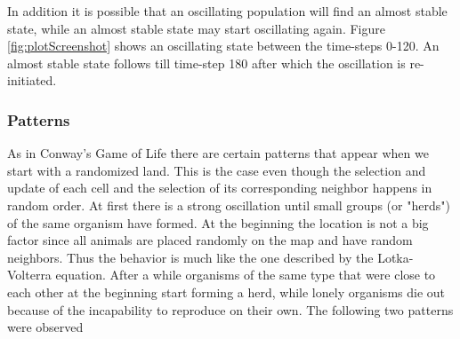 \documentclass[11pt]{article}
\begin{document}
In addition it is possible that an oscillating population will find an almost stable state, while an almost stable state may start oscillating again. Figure \ref{fig:plotScreenshot} shows an oscillating state between the time-steps 0-120. An almost stable state follows till time-step 180 after which the oscillation is re-initiated. 


\subsubsection{Patterns}
\label{sec:patterns}
As in Conway's Game of Life there are certain patterns that appear when we start with a randomized land. This is the case even though the selection and update of each cell and the selection of its corresponding neighbor happens in random order.  At first there is a strong oscillation until small groups (or "herds") of the same organism have formed. At the beginning the location is not a big factor since all animals are placed randomly on the map and have random neighbors. Thus the behavior is much like the one described by the Lotka-Volterra equation. After a while organisms of the same type that were close to each other at the beginning start forming a herd, while lonely organisms die out because of the incapability to reproduce on their own. 
The following two patterns were observed
\end{document}
